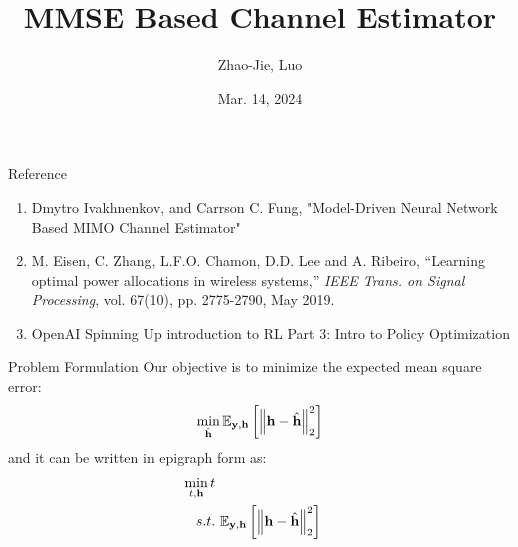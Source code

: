 \documentclass[hyperref={bookmarks=false}]{beamer}
\title{MMSE Based Channel Estimator}
\author{Zhao-Jie, Luo}
\institute[NYCU] %
{
\textit{janny00kevin@gmail.com} %
\\
\medskip
Advisor: Professor Carrson C. Fung\\ 
\medskip
National Yang Ming Chiao Tung University \\ %
}
\date{Mar. 14, 2024}
\begin{document}
\frame{\titlepage}

\begin{frame}{Reference}
\begin{enumerate}
    \item  Dmytro Ivakhnenkov, and Carrson C. Fung, "Model-Driven Neural Network Based MIMO Channel Estimator"
    \item M. Eisen, C. Zhang, L.F.O. Chamon, D.D. Lee and A. Ribeiro, ``Learning optimal power allocations in wireless systems,'' \emph{IEEE Trans. on Signal Processing}, vol. 67(10), pp. 2775-2790, May 2019.
    \item OpenAI Spinning Up introduction to RL Part 3: Intro to Policy Optimization %
\end{enumerate}

\end{frame}


\begin{frame}{Problem Formulation}
Our objective is to minimize the expected mean square error:
\begin{align*}
    \min_{\hat{{\bf h}}} \mathbb{E}_{{\bf y},{\bf h}}\left[\left\| {\bf h}-\hat{{\bf h}} \right\|^2_2 \right]\\
\end{align*}
and it can be written in epigraph form as:
\begin{align*}
    \min_{t,{\bf h}} {t}\\
    s.t. &\ \mathbb{E}_{{\bf y},{\bf h}}\left[\left\| {\bf h}-\hat{{\bf h}} \right\|^2_2 \right]\\
\end{align*}

\end{frame}
\end{document}
